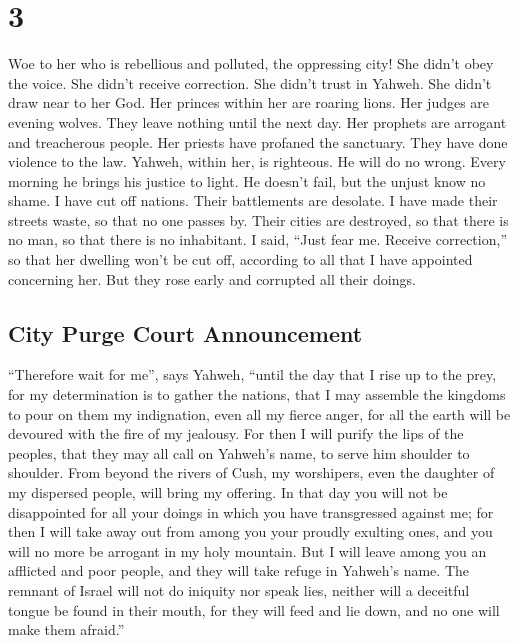 \hypertarget{section-2}{%
\section{3}\label{section-2}}

 Woe to her who is rebellious and polluted, the oppressing
city!  She didn't obey the voice. She didn't receive
correction. She didn't trust in Yahweh. She didn't draw near to her God.
 Her princes within her are roaring lions. Her judges are
evening wolves. They leave nothing until the next day. 
Her prophets are arrogant and treacherous people. Her priests have
profaned the sanctuary. They have done violence to the law.
 Yahweh, within her, is righteous. He will do no wrong.
Every morning he brings his justice to light. He doesn't fail, but the
unjust know no shame.  I have cut off nations. Their
battlements are desolate. I have made their streets waste, so that no
one passes by. Their cities are destroyed, so that there is no man, so
that there is no inhabitant.  I said, ``Just fear me.
Receive correction,'' so that her dwelling won't be cut off, according
to all that I have appointed concerning her. But they rose early and
corrupted all their doings.

\hypertarget{city-purge-court-announcement}{%
\subsection{City Purge Court
Announcement}\label{city-purge-court-announcement}}

 ``Therefore wait for me'', says Yahweh, ``until the day
that I rise up to the prey, for my determination is to gather the
nations, that I may assemble the kingdoms to pour on them my
indignation, even all my fierce anger, for all the earth will be
devoured with the fire of my jealousy.  For then I will
purify the lips of the peoples, that they may all call on Yahweh's name,
to serve him shoulder to shoulder.  From beyond the
rivers of Cush, my worshipers, even the daughter of my dispersed people,
will bring my offering.  In that day you will not be
disappointed for all your doings in which you have transgressed against
me; for then I will take away out from among you your proudly exulting
ones, and you will no more be arrogant in my holy mountain.
 But I will leave among you an afflicted and poor people,
and they will take refuge in Yahweh's name.  The remnant
of Israel will not do iniquity nor speak lies, neither will a deceitful
tongue be found in their mouth, for they will feed and lie down, and no
one will make them afraid.''

